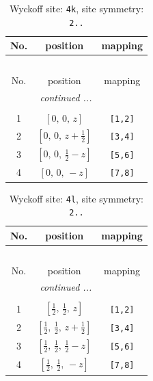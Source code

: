 \documentclass[fleqn,8pt]{jsarticle}
\begin{document}
\renewcommand{\arraystretch}{1.2}
\begin{longtable}{ccc}
\caption{Wyckoff site: {\tt 4k}, site symmetry: {\tt 2..}}
 \\
 \hline \hline
No. & position & mapping \\ \hline \endfirsthead

\multicolumn{2}{l}{\tablename\ \thetable{}} \\
 \hline \hline
No. & position & mapping \\ \hline \endhead

 \hline \hline
\multicolumn{2}{r}{\footnotesize\it continued ...} \\ \endfoot

 \hline \hline
\multicolumn{2}{r}{} \\ \endlastfoot

1 & $\left[ 0,\, 0,\, z \right]$ & {\tt [1,2]} \\ \hline
2 & $\left[ 0,\, 0,\, z + \frac{1}{2} \right]$ & {\tt [3,4]} \\ \hline
3 & $\left[ 0,\, 0,\, \frac{1}{2} - z \right]$ & {\tt [5,6]} \\ \hline
4 & $\left[ 0,\, 0,\, - z \right]$ & {\tt [7,8]} \\
\end{longtable}
\renewcommand{\arraystretch}{1.2}
\begin{longtable}{ccc}
\caption{Wyckoff site: {\tt 4l}, site symmetry: {\tt 2..}}
 \\
 \hline \hline
No. & position & mapping \\ \hline \endfirsthead

\multicolumn{2}{l}{\tablename\ \thetable{}} \\
 \hline \hline
No. & position & mapping \\ \hline \endhead

 \hline \hline
\multicolumn{2}{r}{\footnotesize\it continued ...} \\ \endfoot

 \hline \hline
\multicolumn{2}{r}{} \\ \endlastfoot

1 & $\left[ \frac{1}{2},\, \frac{1}{2},\, z \right]$ & {\tt [1,2]} \\ \hline
2 & $\left[ \frac{1}{2},\, \frac{1}{2},\, z + \frac{1}{2} \right]$ & {\tt [3,4]} \\ \hline
3 & $\left[ \frac{1}{2},\, \frac{1}{2},\, \frac{1}{2} - z \right]$ & {\tt [5,6]} \\ \hline
4 & $\left[ \frac{1}{2},\, \frac{1}{2},\, - z \right]$ & {\tt [7,8]} \\
\end{longtable}
\end{document}
